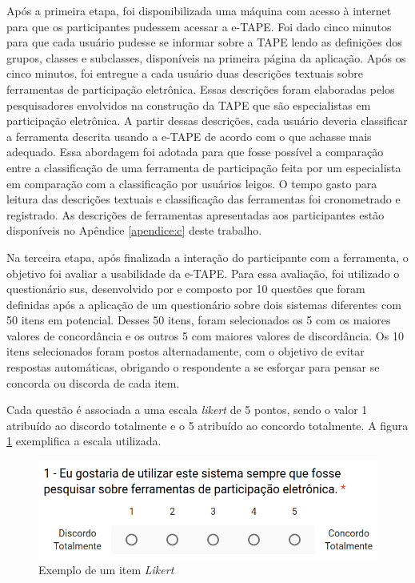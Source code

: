 \par
Após a primeira etapa, foi disponibilizada uma máquina com acesso à internet para que os participantes pudessem acessar a e-TAPE. Foi dado cinco minutos para que cada usuário pudesse se informar sobre a TAPE lendo as definições dos grupos, classes e subclasses,
disponíveis na primeira página da aplicação. 
Após os cinco minutos, foi entregue a cada usuário duas descrições textuais sobre ferramentas de participação eletrônica. Essas descrições foram elaboradas pelos pesquisadores envolvidos na construção da TAPE que são especialistas em participação eletrônica. 
A partir dessas descrições, cada usuário deveria classificar a ferramenta descrita usando a e-TAPE de acordo com o que achasse mais adequado.
Essa abordagem foi adotada para que fosse possível a comparação entre a classificação de uma ferramenta de participação feita por um especialista em comparação com a classificação por usuários leigos. O tempo gasto para leitura das descrições textuais e classificação das ferramentas foi cronometrado e registrado.
As descrições de ferramentas apresentadas aos participantes estão disponíveis no Apêndice \ref{apendice:c} deste trabalho.

\par
Na terceira etapa, após finalizada a interação do participante com a ferramenta, o objetivo foi avaliar a usabilidade da e-TAPE.
Para essa avaliação, foi utilizado o questionário \acrfull{sus}, desenvolvido por  e composto por 10 questões que foram definidas após a aplicação de um questionário sobre dois sistemas diferentes com 50 itens em potencial. Desses 50 itens, foram selecionados os 5 com os maiores valores de concordância e os outros 5 com maiores valores de discordância. Os 10 itens selecionados
foram postos alternadamente, com o objetivo de evitar respostas automáticas, obrigando o respondente a se esforçar para pensar se concorda ou discorda de cada item. 

\par

Cada questão é associada a uma escala \textit{likert} de 5 pontos, sendo o valor 1 atribuído ao discordo totalmente e o 5 atribuído ao concordo totalmente.
A figura \ref{fig:exemplo-pergunta} exemplifica a escala utilizada.

\begin{figure}[!ht]
    \centering
    \includegraphics[scale=0.4]{./figuras/exemplo_pergunta.png}
    \caption{Exemplo de um item \textit{Likert}}
    \label{fig:exemplo-pergunta}
\end{figure}

